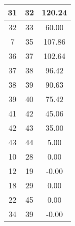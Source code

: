 \begin{table}[H]
\begin{minipage}{.5\linewidth}
\begin{tabular}{|c|c|c|}
            31 &  32 &   120.24\\ \hline
            32 &  33 &    60.00\\ \hline
             7 &  35 &   107.86\\ \hline
            36 &  37 &   102.64\\ \hline
            37 &  38 &    96.42\\ \hline
            38 &  39 &    90.63\\ \hline
            39 &  40 &    75.42\\ \hline
            41 &  42 &    45.06\\ \hline
            42 &  43 &    35.00\\ \hline
            43 &  44 &     5.00\\ \hline
            10 &  28 &     0.00\\ \hline
            12 &  19 &    -0.00\\ \hline
            18 &  29 &     0.00\\ \hline
            22 &  45 &     0.00\\ \hline
            34 &  39 &    -0.00\\ \hline
        \end{tabular}
    \end{minipage} 
\end{table}


